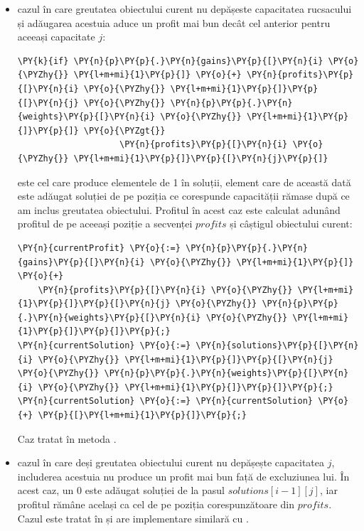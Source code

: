 \begin{sloppypar}
\begin{itemize}
\begin{Verbatim}[commandchars=\\\{\}]
\PY{n}{currentSolution} \PY{o}{:=} \PY{n}{solutions}\PY{p}{[}\PY{n}{i} \PY{o}{\PYZhy{}} \PY{l+m+mi}{1}\PY{p}{]}\PY{p}{[}\PY{n}{j}\PY{p}{]}\PY{p}{;}
\PY{n}{currentSolution} \PY{o}{:=} \PY{n}{currentSolution} \PY{o}{+} \PY{p}{[}\PY{l+m+mi}{0}\PY{p}{]}\PY{p}{;}
\end{Verbatim}
        este implementarea din metoda .
        \item cazul în care greutatea obiectului curent nu depășeste capacitatea rucsacului și adăugarea acestuia aduce un profit mai bun decât cel anterior pentru aceeași capacitate $j$:
        \begin{Verbatim}[commandchars=\\\{\}]
 \PY{k}{if} \PY{n}{p}\PY{p}{.}\PY{n}{gains}\PY{p}{[}\PY{n}{i} \PY{o}{\PYZhy{}} \PY{l+m+mi}{1}\PY{p}{]} \PY{o}{+} \PY{n}{profits}\PY{p}{[}\PY{n}{i} \PY{o}{\PYZhy{}} \PY{l+m+mi}{1}\PY{p}{]}\PY{p}{[}\PY{n}{j} \PY{o}{\PYZhy{}} \PY{n}{p}\PY{p}{.}\PY{n}{weights}\PY{p}{[}\PY{n}{i} \PY{o}{\PYZhy{}} \PY{l+m+mi}{1}\PY{p}{]}\PY{p}{]} \PY{o}{\PYZgt{}} 
                    \PY{n}{profits}\PY{p}{[}\PY{n}{i} \PY{o}{\PYZhy{}} \PY{l+m+mi}{1}\PY{p}{]}\PY{p}{[}\PY{n}{j}\PY{p}{]}
\end{Verbatim}
        este cel care produce elementele de 1 în soluții, element care de această dată este adăugat soluției de pe poziția ce corespunde capacității rămase după ce am inclus greutatea obiectului. Profitul în acest caz este calculat adunând profitul de pe aceeași poziție a secvenței $profits$ și câștigul obiectului curent:
        \begin{Verbatim}[commandchars=\\\{\}]
\PY{n}{currentProfit} \PY{o}{:=} \PY{n}{p}\PY{p}{.}\PY{n}{gains}\PY{p}{[}\PY{n}{i} \PY{o}{\PYZhy{}} \PY{l+m+mi}{1}\PY{p}{]} \PY{o}{+} 
    \PY{n}{profits}\PY{p}{[}\PY{n}{i} \PY{o}{\PYZhy{}} \PY{l+m+mi}{1}\PY{p}{]}\PY{p}{[}\PY{n}{j} \PY{o}{\PYZhy{}} \PY{n}{p}\PY{p}{.}\PY{n}{weights}\PY{p}{[}\PY{n}{i} \PY{o}{\PYZhy{}} \PY{l+m+mi}{1}\PY{p}{]}\PY{p}{]}\PY{p}{;}
\PY{n}{currentSolution} \PY{o}{:=} \PY{n}{solutions}\PY{p}{[}\PY{n}{i} \PY{o}{\PYZhy{}} \PY{l+m+mi}{1}\PY{p}{]}\PY{p}{[}\PY{n}{j} \PY{o}{\PYZhy{}} \PY{n}{p}\PY{p}{.}\PY{n}{weights}\PY{p}{[}\PY{n}{i} \PY{o}{\PYZhy{}} \PY{l+m+mi}{1}\PY{p}{]}\PY{p}{]}\PY{p}{;}
\PY{n}{currentSolution} \PY{o}{:=} \PY{n}{currentSolution} \PY{o}{+} \PY{p}{[}\PY{l+m+mi}{1}\PY{p}{]}\PY{p}{;}
\end{Verbatim}
        Caz tratat în metoda .
        \item cazul în care deși greutatea obiectului curent nu depășește capacitatea $j$, includerea acestuia nu produce un profit mai bun față de excluziunea lui. În acest caz, un 0 este adăugat soluției de la pasul $solutions[i - 1][j]$, iar profitul rămâne același ca cel de pe poziția corespunzătoare din $profits$. Cazul este tratat în  și are implementare similară cu .

\end{itemize}
\end{sloppypar}
